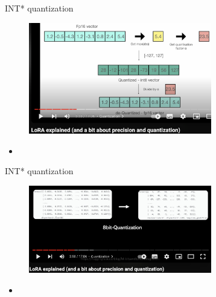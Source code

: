 \begin{vbframe}{INT* quantization}




\vfill

\begin{figure}
\centering
\includegraphics[width = 8cm]{figure/quantization1}
\end{figure}

\begin{itemize}
\item \

\end{itemize}



\vfill

\end{vbframe}


\begin{vbframe}{INT* quantization}




\vfill

\begin{figure}
\centering
\includegraphics[width = 8cm]{figure/quantization2}
\end{figure}

\begin{itemize}
\item \

\end{itemize}



\vfill

\end{vbframe}


